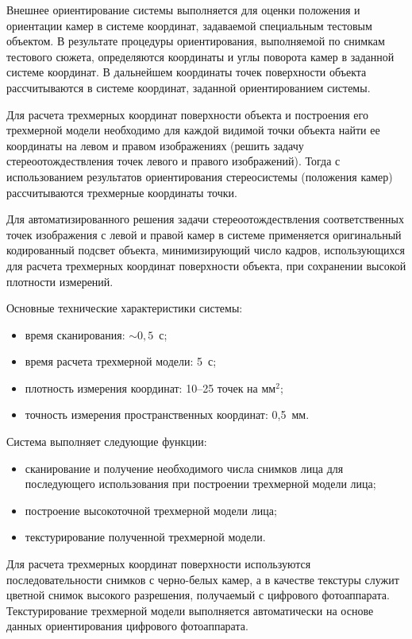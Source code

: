\begin{multicols}{2}
Внешнее ориентирование системы выполняется для оценки положения и ориентации камер в системе координат, задаваемой 
специальным тестовым объектом. В результате процедуры ориентирования, выполняемой по снимкам тестового сюжета, 
определяются координаты и углы поворота камер в заданной системе координат. В дальнейшем координаты точек поверхности 
объекта рассчитываются в системе координат, заданной ориентированием системы.

Для расчета трехмерных координат поверхности объекта и построения его трехмерной модели необходимо для каждой видимой 
точки объекта найти ее координаты на левом и правом изображениях (решить задачу стереоотождествления точек левого и 
правого изображений). Тогда с использованием результатов ориентирования стереосистемы (положения камер) рассчитываются 
трехмерные координаты точки.

Для автоматизированного решения задачи стереоотождествления соответственных точек изображения с левой и правой камер в 
системе применяется оригинальный кодированный подсвет объекта, минимизирующий число кадров, использующихся для 
расчета трехмерных координат поверхности объекта, при сохранении высокой плотности измерений. 

Основные технические характеристики сис\-темы:
\begin{itemize}
\item время сканирования: $\sim  0{,}5$~с; 
\item время расчета трехмерной модели: 5~с;
\item плотность измерения координат: 10--25 точек на мм$^2$;
\item точность измерения пространственных координат: 0,5~мм.
\end{itemize}

Система выполняет следующие функции: 
\begin{itemize}
\item сканирование и получение необходимого числа снимков лица для последующего использования при построении трехмерной 
модели лица;
\item построение высокоточной трехмерной модели лица;
\item текстурирование полученной трехмерной модели.
\end{itemize}

Для расчета трехмерных координат по\-верх\-ности\linebreak
 используются последовательности снимков с чер\-но-бе\-лых камер, а в качестве 
текстуры служит цветной снимок высокого разрешения, по\-лу\-ча\-емый с циф\-ро\-во\-го фотоаппарата. Текстурирование трехмерной 
модели выполняется автоматически на основе данных ориентирования циф\-ро\-во\-го фотоаппарата.


\end{multicols}
